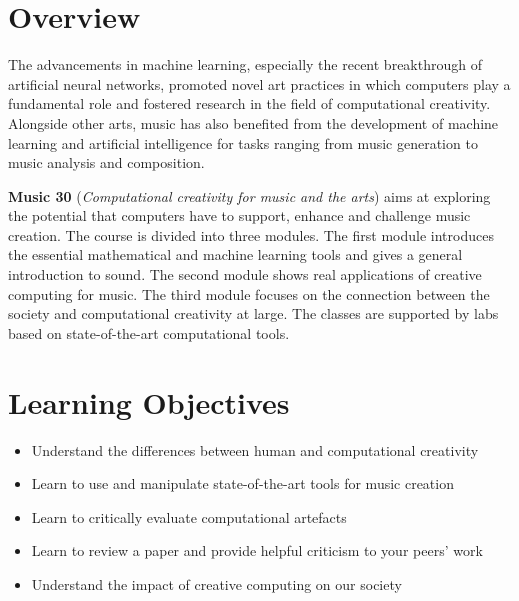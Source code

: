 \documentclass[letterpaper]{inzane_syllabus} %
\begin{document}

\makeprofile %

\section{Overview}

 The advancements in machine learning, especially the recent breakthrough of artificial neural networks, promoted novel art practices in which computers play a fundamental role and fostered research in the field of computational creativity. Alongside other arts, music has also benefited from the development of machine learning and artificial intelligence for tasks ranging from music generation to music analysis and composition.

 \textbf{Music 30} (\emph{Computational creativity for music and the arts}) aims at exploring the potential that computers have to support, enhance and challenge music creation. The course is divided into three modules. The first module introduces the essential mathematical and machine learning tools and gives a general introduction to sound. The second module shows real applications of creative computing for music. The third module focuses on the connection between the society and computational creativity at large. The classes are supported by labs based on state-of-the-art computational tools.



\vspace{0.5cm}
\section{Learning Objectives}

\begin{itemize}
\item Understand the differences between human and computational creativity 
\item Learn to use and manipulate state-of-the-art tools for music creation
\item Learn to critically evaluate computational artefacts
\item Learn to review a paper and provide helpful criticism to your peers' work
\item Understand the impact of creative computing on our society
\end{itemize}
\end{document}
